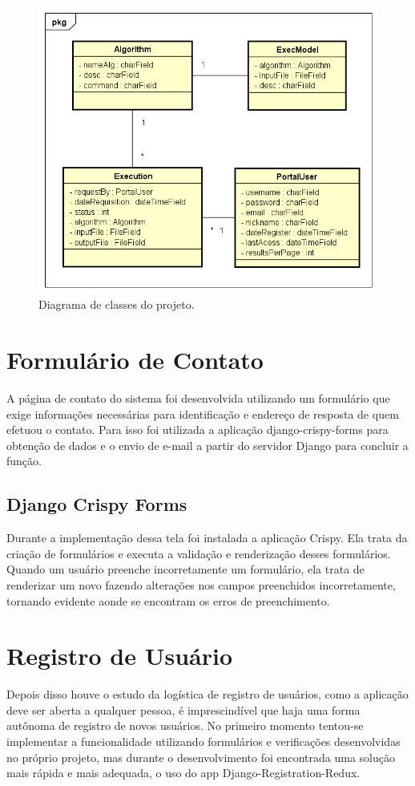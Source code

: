 \documentclass[tg]{mdtufsm}
\begin{document}
\begin{figure}
	\centering
	\includegraphics[width=1\textwidth]{class_diagran_tg}
	\caption{
		Diagrama de classes do projeto.
	}
	\label{fig:classdiagram}
\end{figure}


\section{Formulário de Contato}
A página de contato do sistema foi desenvolvida utilizando um formulário que exige informações necessárias para identificação e endereço de resposta de quem efetuou o contato. Para isso foi utilizada a aplicação django-crispy-forms para obtenção de dados e o envio de e-mail a partir do servidor Django para concluir a função.

\subsection{Django Crispy Forms}
Durante a implementação dessa tela foi instalada a aplicação Crispy. Ela trata da criação de formulários e executa a validação e renderização desses formulários. Quando um usuário preenche incorretamente um formulário, ela trata de renderizar um novo fazendo alterações nos campos preenchidos incorretamente, tornando evidente aonde se encontram os erros de preenchimento.

\section{Registro de Usuário}
Depois disso houve o estudo da logística de registro de usuários, como a aplicação deve ser aberta a qualquer pessoa, é imprescindível que haja uma forma autônoma de registro de novos usuários. No primeiro momento tentou-se implementar a funcionalidade utilizando formulários e verificações desenvolvidas no próprio projeto, mas durante o desenvolvimento foi encontrada uma solução mais rápida e mais adequada, o uso do app Django-Registration-Redux.
\end{document}
